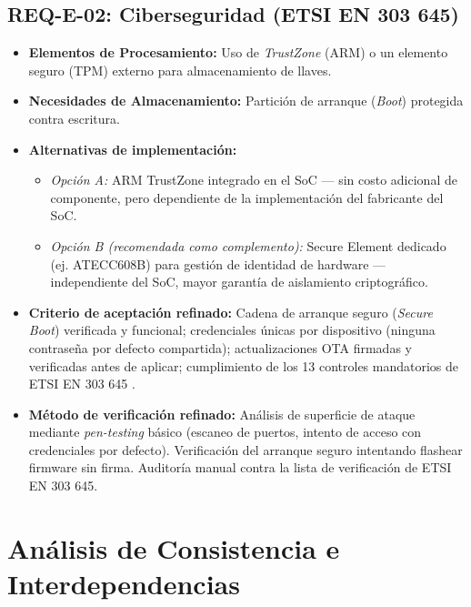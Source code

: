 \documentclass[%
	paper=a4,
	twoside=false,
	parskip=half,
	chapterprefix=false,
	10pt,
	headings=normal,
	bibliography=totoc,
	listof=totoc,
	titlepage=on,
	captions=tableabove,
	draft=false, 
]{scrbook}%
\begin{document}
\section{REQ-E-02: Ciberseguridad (ETSI EN 303 645)}
\begin{itemize}
    \item \textbf{Elementos de Procesamiento:} Uso de \textit{TrustZone} (ARM) o un elemento seguro (TPM) externo para almacenamiento de llaves.
    \item \textbf{Necesidades de Almacenamiento:} Partición de arranque (\textit{Boot}) protegida contra escritura.
    \item \textbf{Alternativas de implementación:}
        \begin{itemize}
            \item \textit{Opción A:} ARM TrustZone integrado en el SoC — sin costo adicional de componente, pero dependiente de la implementación del fabricante del SoC.
            \item \textit{Opción B (recomendada como complemento):} Secure Element dedicado (ej. ATECC608B) para gestión de identidad de hardware — independiente del SoC, mayor garantía de aislamiento criptográfico.
        \end{itemize}
    \item \textbf{Criterio de aceptación refinado:} Cadena de arranque seguro (\textit{Secure Boot}) verificada y funcional; credenciales únicas por dispositivo (ninguna contraseña por defecto compartida); actualizaciones OTA firmadas y verificadas antes de aplicar; cumplimiento de los 13 controles mandatorios de ETSI EN 303 645 \cite{etsi303645}.
    \item \textbf{Método de verificación refinado:} Análisis de superficie de ataque mediante \textit{pen-testing} básico (escaneo de puertos, intento de acceso con credenciales por defecto). Verificación del arranque seguro intentando flashear firmware sin firma. Auditoría manual contra la lista de verificación de ETSI EN 303 645.
\end{itemize}

\chapter{Análisis de Consistencia e Interdependencias}
\label{chap:consistencia}
\end{document}
